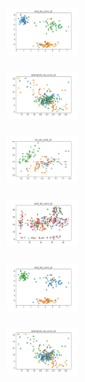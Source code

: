 \begin{figure}[H]
\begin{subfigure}
        \centering
        \includegraphics[width=0.234\textwidth]{img/hs-ls/rand_set_const_20_277451237_clust.png}
    \end{subfigure}
    \hfill
    \begin{subfigure}
        \centering
        \includegraphics[width=0.234\textwidth]{img/hs-ls/newthyroid_set_const_20_277451237_clust.png}
    \end{subfigure}
    \hfill
    \begin{subfigure}
        \centering
        \includegraphics[width=0.234\textwidth]{img/hs-ls/iris_set_const_20_49258669_clust.png}
    \end{subfigure}
    \hfill
    \begin{subfigure}
        \centering
        \includegraphics[width=0.234\textwidth]{img/hs-ls/ecoli_set_const_20_49258669_clust.png}
    \end{subfigure}
    \hfill
    \begin{subfigure}
        \centering
        \includegraphics[width=0.234\textwidth]{img/hs-ls/rand_set_const_20_49258669_clust.png}
    \end{subfigure}
    \hfill
    \begin{subfigure}
        \centering
        \includegraphics[width=0.234\textwidth]{img/hs-ls/newthyroid_set_const_20_49258669_clust.png}

\end{subfigure}
\end{figure}

